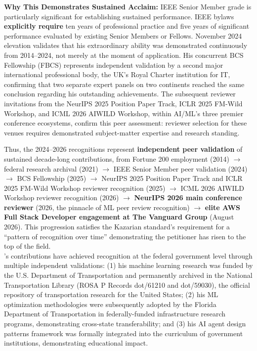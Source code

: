 \textbf{Why This Demonstrates Sustained Acclaim:} IEEE Senior Member grade is particularly significant for establishing sustained performance. IEEE bylaws \textbf{explicitly require} ten years of professional practice and five years of significant performance evaluated by existing Senior Members or Fellows. \drs November 2024 elevation validates that his extraordinary ability was demonstrated continuously from 2014--2024, not merely at the moment of application. His concurrent BCS Fellowship (FBCS) represents independent validation by a second major international professional body, the UK's Royal Charter institution for IT, confirming that two separate expert panels on two continents reached the same conclusion regarding his outstanding achievements. The subsequent reviewer invitations from the NeurIPS 2025 Position Paper Track, ICLR 2025 FM-Wild Workshop, and ICML 2026 AIWILD Workshop, within AI/ML's three premier conference ecosystems, confirm this peer assessment: reviewer selection for these venues requires demonstrated subject-matter expertise and research standing.

Thus, the 2024--2026 recognitions represent \textbf{independent peer validation} of \drs sustained decade-long contributions, from Fortune 200 employment (2014) $\rightarrow$ federal research archival (2021) $\rightarrow$ IEEE Senior Member peer validation (2024) $\rightarrow$ BCS Fellowship (2025) $\rightarrow$ NeurIPS 2025 Position Paper Track and ICLR 2025 FM-Wild Workshop reviewer recognition (2025) $\rightarrow$ ICML 2026 AIWILD Workshop reviewer recognition (2026) $\rightarrow$ \textbf{NeurIPS 2026 main conference reviewer} (2026, the pinnacle of ML peer review recognition) $\rightarrow$ \textbf{elite AWS Full Stack Developer engagement at The Vanguard Group} (August 2026). This progression satisfies the Kazarian standard's requirement for a ``pattern of recognition over time'' demonstrating the petitioner has risen to the top of the field.\\


\dr's contributions have achieved recognition at the federal government level through multiple independent validations: (1) his machine learning research was funded by the U.S. Department of Transportation and permanently archived in the National Transportation Library (ROSA P Records dot/61210 and dot/59030), the official repository of transportation research for the United States; (2) his ML optimization methodologies were subsequently adopted by the Florida Department of Transportation in federally-funded infrastructure research programs, demonstrating cross-state transferability; and (3) his AI agent design patterns framework was formally integrated into the curriculum of government institutions, demonstrating educational impact.

